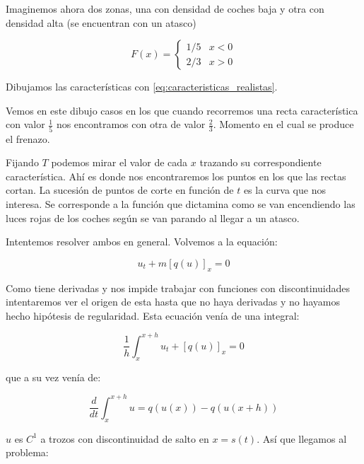 		\begin{example}[Frenazo]

			Imaginemos ahora dos zonas, una con densidad de coches baja y otra con densidad alta (se encuentran con un atasco)

			\begin{figure}[!htb]
				\centering
				\caption{}
				\label{fig:modeloAtasco}
			\end{figure}

			$$F(x) =
			\begin{cases}
				1/5 & x < 0 \\
				2/3 & x > 0
			\end{cases}
			$$

			Dibujamos las características con \ref{eq:caracteristicas_realistas}.

			\begin{figure}[!htb]
				\centering
				\caption{}
				\label{fig:ondaChoque}
			\end{figure}

			Vemos en este dibujo casos en los que cuando recorremos una recta característica con valor $\frac{1}{5}$ nos encontramos con otra de valor $\frac{2}{3}$. Momento en el cual se produce el frenazo.

			Fijando $T$ podemos mirar el valor de cada $x$ trazando su correspondiente característica. Ahí es donde nos encontraremos los puntos en los que las rectas cortan. La sucesión de puntos de corte en función de $t$ es la curva que nos interesa. Se corresponde a la función que dictamina como se van encendiendo las luces rojas de los coches según se van parando al llegar a un atasco.

		\end{example}

		Intentemos resolver ambos en general. Volvemos a la equación:

		$$u_t +m [q(u)]_x = 0$$

		Como tiene derivadas y nos impide trabajar con funciones con discontinuidades intentaremos ver el origen de esta hasta que no haya derivadas y no hayamos hecho hipótesis de regularidad. Esta ecuación venía de una integral:

		$$\frac{1}{h} \int^{x+h}_{x} u_t + [q(u)]_x = 0$$

		que a su vez venía de:

		$$\frac{d}{dt} \int^{x+h}_{x} u = q(u(x))-q(u(x+h))$$

		$u$ es $C^1$ a trozos con discontinuidad de salto en $x=s(t)$. Así que llegamos al problema:

